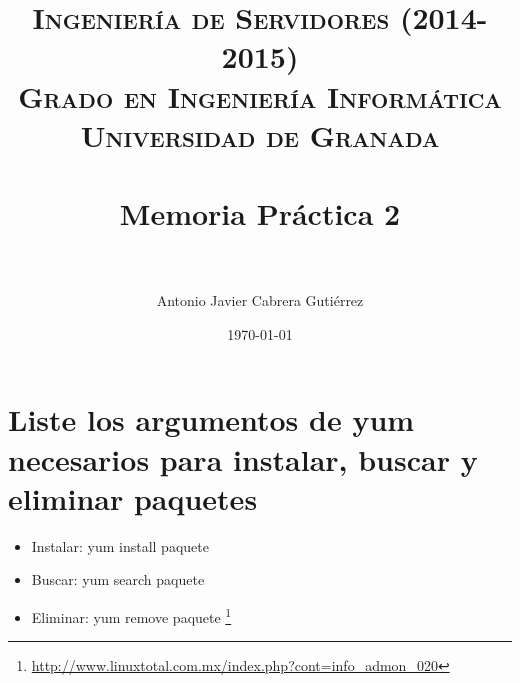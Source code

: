 


\title{	
\normalfont \normalsize 
\textsc{{\bf Ingeniería de Servidores (2014-2015)} \\ Grado en Ingeniería Informática \\ Universidad de Granada} \\ [25pt] %
\horrule{0.5pt} \\[0.4cm] %
\huge Memoria Práctica 2 \\ %
\horrule{2pt} \\[0.5cm] %
}

\author{Antonio Javier Cabrera Gutiérrez } %

\date{\normalsize\today} %




\maketitle %

\newpage %

\tableofcontents %

\listoffigures



\newpage

\section{Liste los argumentos de yum necesarios para instalar, buscar y eliminar paquetes}
\begin{itemize}
\item Instalar: yum install paquete
\item Buscar: yum search paquete
\item Eliminar: yum remove paquete
\footnote{\url{http://www.linuxtotal.com.mx/index.php?cont=info_admon_020}}
\end{itemize}
